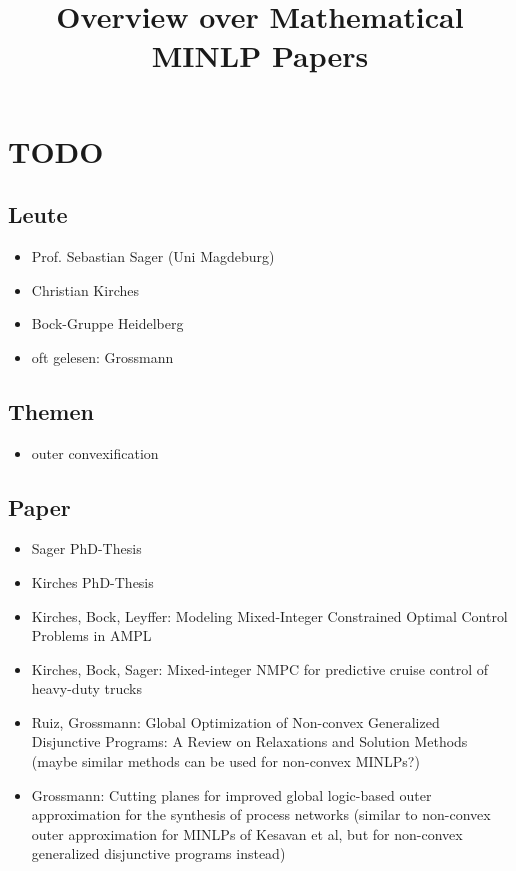 \documentclass{article}
\title{\textbf{Overview over Mathematical MINLP Papers}}
\date{}
\begin{document}
\maketitle
\tableofcontents

\newpage

\section{TODO}
\subsection{Leute}
\begin{itemize}
\item Prof. Sebastian Sager (Uni Magdeburg)
\item Christian Kirches
\item Bock-Gruppe Heidelberg
\item oft gelesen: Grossmann
\end{itemize}
\subsection{Themen}
\begin{itemize}
\item outer convexification
\end{itemize}
\subsection{Paper}
\begin{itemize}
\item Sager PhD-Thesis
\item Kirches PhD-Thesis
\item Kirches, Bock, Leyffer: Modeling Mixed-Integer Constrained
Optimal Control Problems in AMPL
\item Kirches, Bock, Sager: Mixed-integer NMPC for predictive cruise control of heavy-duty trucks
\item Ruiz, Grossmann: Global Optimization of Non-convex Generalized
Disjunctive Programs: A Review on Relaxations and Solution Methods (maybe similar methods can be used for non-convex MINLPs?)
\item Grossmann: Cutting planes for improved global logic-based outer approximation
for the synthesis of process networks (similar to non-convex outer approximation for MINLPs of Kesavan et al, but for non-convex generalized disjunctive programs instead)
\end{itemize}
\end{document}
